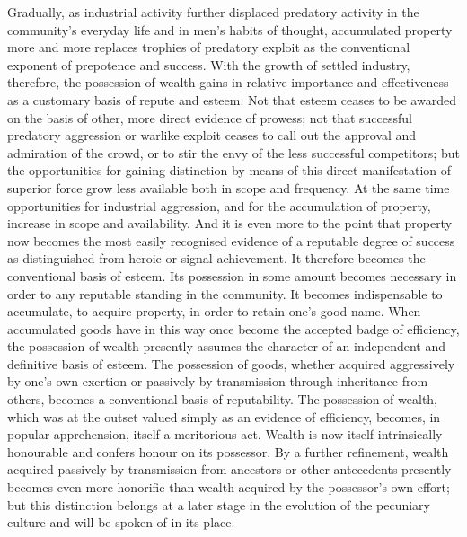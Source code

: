 \documentclass[12pt]{report}
\begin{document}
Gradually, as industrial activity further displaced predatory activity
in the community's everyday life and in men's habits of thought,
accumulated property more and more replaces trophies of predatory
exploit as the conventional exponent of prepotence and success. With the
growth of settled industry, therefore, the possession of wealth gains in
relative importance and effectiveness as a customary basis of repute and
esteem. Not that esteem ceases to be awarded on the basis of other, more
direct evidence of prowess; not that successful predatory aggression or
warlike exploit ceases to call out the approval and admiration of the
crowd, or to stir the envy of the less successful competitors; but
the opportunities for gaining distinction by means of this direct
manifestation of superior force grow less available both in scope and
frequency. At the same time opportunities for industrial aggression, and
for the accumulation of property, increase in scope and availability.
And it is even more to the point that property now becomes the
most easily recognised evidence of a reputable degree of success as
distinguished from heroic or signal achievement. It therefore becomes
the conventional basis of esteem. Its possession in some amount becomes
necessary in order to any reputable standing in the community. It
becomes indispensable to accumulate, to acquire property, in order to
retain one's good name. When accumulated goods have in this way once
become the accepted badge of efficiency, the possession of wealth
presently assumes the character of an independent and definitive basis
of esteem. The possession of goods, whether acquired aggressively by
one's own exertion or passively by transmission through inheritance from
others, becomes a conventional basis of reputability. The possession
of wealth, which was at the outset valued simply as an evidence of
efficiency, becomes, in popular apprehension, itself a meritorious act.
Wealth is now itself intrinsically honourable and confers honour on
its possessor. By a further refinement, wealth acquired passively by
transmission from ancestors or other antecedents presently becomes even
more honorific than wealth acquired by the possessor's own effort;
but this distinction belongs at a later stage in the evolution of the
pecuniary culture and will be spoken of in its place.
\end{document}
